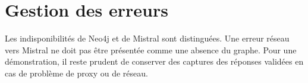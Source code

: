 
\section{Gestion des erreurs}

Les indisponibilités de Neo4j et de Mistral sont distinguées. Une erreur réseau vers Mistral ne doit pas être présentée comme une absence du graphe. Pour une démonstration, il reste prudent de conserver des captures des réponses validées en cas de problème de proxy ou de réseau.

